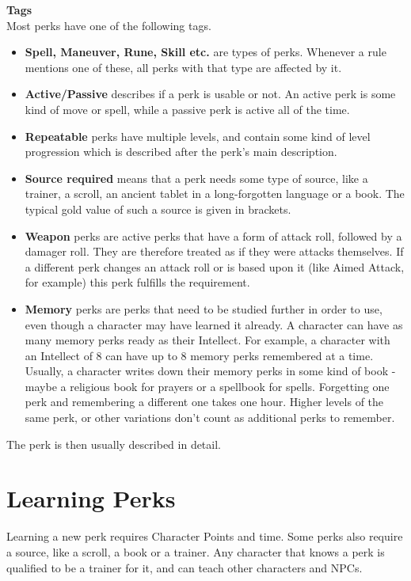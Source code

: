 \textbf{Tags}\\
Most perks have one of the following tags.\\
\begin{itemize}
	\item \textbf{Spell, Maneuver, Rune, Skill etc.} are types of perks. Whenever a rule mentions one of these, all perks with that type are affected by it.\\
	\item \textbf{Active/Passive} describes if a perk is usable or not. An active perk is some kind of move or spell, while a passive perk is active all of the time.\\
	\item \textbf{Repeatable} perks have multiple levels, and contain some kind of level progression which is described after the perk's main description.\\
	\item \textbf{Source required} means that a perk needs some type of source, like a trainer, a scroll, an ancient tablet in a long-forgotten language or a book. The typical gold value of such a source is given in brackets.\\
	\item \textbf{Weapon} perks are active perks that have a form of attack roll, followed by a damager roll. They are therefore treated as if they were attacks themselves. If a different perk changes an attack roll or is based upon it (like Aimed Attack, for example) this perk fulfills the requirement.\\
	\item \textbf{Memory} perks are perks that need to be studied further in order to use, even though a character may have learned it already. A character can have as many memory perks ready as their Intellect. For example, a character with an Intellect of 8 can have up to 8 memory perks remembered at a time. Usually, a character writes down their memory perks in some kind of book - maybe a religious book for prayers or a spellbook for spells. Forgetting one perk and remembering a different one takes one hour. Higher levels of the same perk, or other variations don't count as additional perks to remember.
\end{itemize}

The perk is then usually described in detail.

\section{Learning Perks}
Learning a new perk requires Character Points and time. Some perks also require a source, like a scroll, a book or a trainer. Any character that knows a perk is qualified to be a trainer for it, and can teach other characters and NPCs. 


